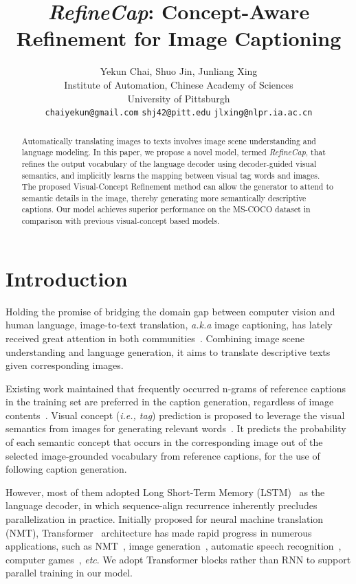\documentclass[11pt]{article}
\title{\textit{RefineCap}: Concept-Aware Refinement for Image Captioning}
\author{Yekun Chai, Shuo Jin,  Junliang Xing\\
      Institute of Automation, Chinese Academy of Sciences \\
      University of Pittsburgh\\
  \texttt{chaiyekun@gmail.com} \quad \texttt{shj42@pitt.edu} \quad \texttt{jlxing@nlpr.ia.ac.cn}\\
  }
\begin{document}
\maketitle
\begin{abstract}
Automatically translating images to texts involves image scene understanding and language modeling. In this paper, we propose a novel model, termed \emph{RefineCap}, that refines the output vocabulary of the language decoder using decoder-guided visual semantics, and implicitly learns the mapping between visual tag words and images. The proposed Visual-Concept Refinement method can allow the generator to attend to semantic details in the image, thereby generating more semantically descriptive captions. Our model achieves superior performance on the MS-COCO dataset in comparison with previous visual-concept based models.
\end{abstract}


\section{Introduction}
\label{sec:intro}
Holding the promise of bridging the domain gap between computer vision and human language, image-to-text translation, \emph{a.k.a} image captioning, has lately received great attention in both communities~\cite{johnson2016densecap,chen2017sca,anderson2018bottom,fan2019bridging}. Combining image scene understanding and language generation, it aims to translate descriptive texts given corresponding images.












Existing work maintained that frequently occurred n-grams of reference captions in the training set are preferred in the caption generation, regardless of image contents~\cite{fan2019bridging}. Visual concept (\emph{i.e., tag}) prediction is proposed to leverage the visual semantics from images for generating relevant words~\cite{wu2016value,you2016image,gan2017semantic,yao2017incorporating,fan2019bridging}. It predicts the probability of each semantic concept that occurs in the corresponding image out of the selected image-grounded vocabulary from reference captions, for the use of following caption generation. 

However, most of them adopted Long Short-Term Memory (LSTM)~\cite{hochreiter1997long} as the language decoder, in which sequence-align recurrence inherently precludes parallelization in practice. Initially proposed for neural machine translation (NMT), Transformer~\cite{vaswani2017attention} architecture has made rapid progress in numerous applications, such as NMT~\cite{ott2018scaling,gu2019levenshtein}, image generation~\cite{parmar2018image}, automatic speech recognition~\cite{dong2018speech}, computer games~\cite{vinyals2019grandmaster}, \emph{etc}. We adopt Transformer blocks rather than RNN to support parallel training in our model.
\end{document}

